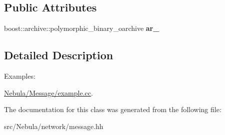 \subsection*{\-Public \-Attributes}
\begin{DoxyCompactItemize}
\item 
\hypertarget{classgal_1_1network_1_1omessage_a8581863d6caf9732e0242269a946e72e}{boost\-::archive\-::polymorphic\-\_\-binary\-\_\-oarchive {\bfseries ar\-\_\-}}\label{classgal_1_1network_1_1omessage_a8581863d6caf9732e0242269a946e72e}

\end{DoxyCompactItemize}


\subsection{\-Detailed \-Description}
\begin{Desc}
\item[\-Examples\-: ]\par
\hyperlink{Nebula_2Message_2example_8cc-example}{\-Nebula/\-Message/example.\-cc}.\end{Desc}


\-The documentation for this class was generated from the following file\-:\begin{DoxyCompactItemize}
\item 
src/\-Nebula/network/message.\-hh\end{DoxyCompactItemize}
